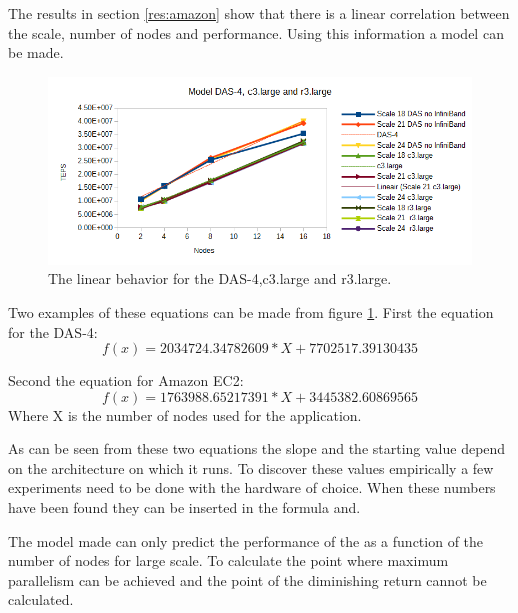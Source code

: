 The results in section \ref{res:amazon} show that there is a linear correlation between the scale, number of nodes and performance. Using this information a model can be made.

\begin{figure}[!h]
	\includegraphics[width=\textwidth]{images/model_figure_1.png}
	\caption{The linear behavior for the DAS-4,c3.large and r3.large.}
	\label{fig:model_first}
\end{figure}

Two examples of these equations can be made from figure \ref{fig:model_first}.
First the equation for the DAS-4:
\begin{equation}
f(x) = 2034724.34782609 * X + 7702517.39130435
\end{equation}

Second the equation for Amazon EC2:
\begin{equation}
f(x) = 1763988.65217391 * X + 3445382.60869565
\end{equation}
Where X is the number of nodes used for the application.

As can be seen from these two equations the slope and the starting value depend on the architecture on which it runs. To discover these values empirically a few experiments need to be done with the hardware of choice. When these numbers have been found they can be inserted in the formula and.

The model made can only predict the performance of the as a function of the number of nodes for large scale. To calculate the point where maximum parallelism can be achieved and the point of the diminishing return cannot be calculated.
